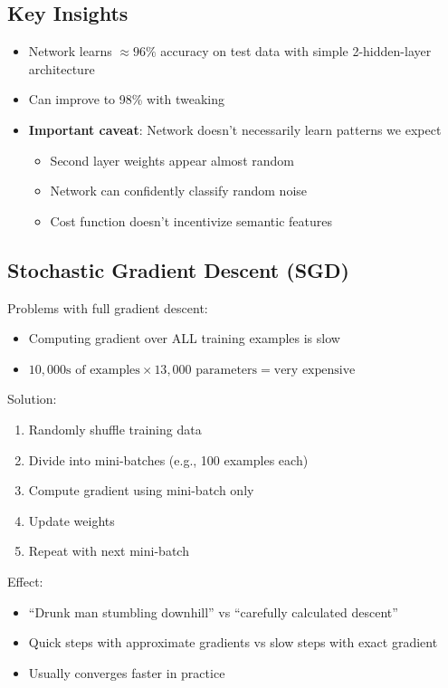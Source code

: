 \documentclass[11pt,a4paper]{article}
\begin{document}
\subsection{Key Insights}
\begin{itemize}
    \item Network learns $\approx 96\%$ accuracy on test data with simple 2-hidden-layer architecture
    \item Can improve to 98\% with tweaking
    \item \textbf{Important caveat}: Network doesn't necessarily learn patterns we expect
    \begin{itemize}
        \item Second layer weights appear almost random
        \item Network can confidently classify random noise
        \item Cost function doesn't incentivize semantic features
    \end{itemize}
\end{itemize}

\subsection{Stochastic Gradient Descent (SGD)}

Problems with full gradient descent:
\begin{itemize}
    \item Computing gradient over ALL training examples is slow
    \item $10,000\text{s of examples} \times 13,000\text{ parameters} = \text{very expensive}$
\end{itemize}

Solution:
\begin{enumerate}
    \item Randomly shuffle training data
    \item Divide into mini-batches (e.g., 100 examples each)
    \item Compute gradient using mini-batch only
    \item Update weights
    \item Repeat with next mini-batch
\end{enumerate}

Effect:
\begin{itemize}
    \item ``Drunk man stumbling downhill'' vs ``carefully calculated descent''
    \item Quick steps with approximate gradients vs slow steps with exact gradient
    \item Usually converges faster in practice
\end{itemize}
\end{document}
